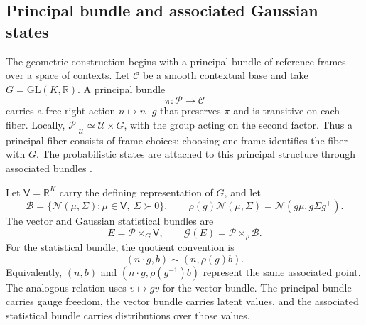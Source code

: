 \documentclass[twoside,11pt]{article}
\begin{document}
\subsection{Principal bundle and associated Gaussian states}
\label{sec:principal_construction}

The geometric construction begins with a principal bundle of reference frames over a space of contexts. Let \(\mathcal C\) be a smooth contextual base and take \(G=\mathrm{GL}(K,\mathbb R)\). A principal bundle
\begin{equation}
\pi:\mathcal P\longrightarrow\mathcal C
\label{eq:principal_bundle}
\end{equation}
carries a free right action \(n\mapsto n\cdot g\) that preserves \(\pi\) and is transitive on each fiber. Locally, \(\mathcal P|_{\mathcal U}\simeq\mathcal U\times G\), with the group acting on the second factor. Thus a principal fiber consists of frame choices; choosing one frame identifies the fiber with \(G\). The probabilistic states are attached to this principal structure through associated bundles \citep{nakahara2003geometry,frankel2011geometry}.

Let \(\mathsf V=\mathbb R^K\) carry the defining representation of \(G\), and let
\begin{equation}
\mathcal B=\{\mathcal N(\mu,\Sigma):\mu\in\mathsf V,\ \Sigma\succ0\},
\qquad
\rho(g)\mathcal N(\mu,\Sigma)=\mathcal N(g\mu,g\Sigma g^\top).
\label{eq:gaussian_associated_action}
\end{equation}
The vector and Gaussian statistical bundles are
\begin{equation}
E=\mathcal P\times_G\mathsf V,
\qquad
\mathcal G(E)=\mathcal P\times_\rho\mathcal B.
\label{eq:associated_state_bundles}
\end{equation}
For the statistical bundle, the quotient convention is
\begin{equation}
(n\cdot g,b)\sim(n,\rho(g)b).
\label{eq:associated_quotient}
\end{equation}
Equivalently, \((n,b)\) and \((n\cdot g,\rho(g^{-1})b)\) represent the same associated point. The analogous relation uses \(v\mapsto gv\) for the vector bundle. The principal bundle carries gauge freedom, the vector bundle carries latent values, and the associated statistical bundle carries distributions over those values.
\end{document}
